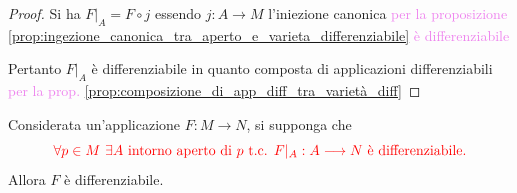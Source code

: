         \begin{proof}
        \mbox{}

        Si ha $F|_A = F \circ j$ essendo $j \colon A \to M$ l'iniezione canonica \textcolor{violet}{per la proposizione \ref{prop:ingezione_canonica_tra_aperto_e_varieta_differenziabile} è differenziabile}
        
        Pertanto $F|_A$ è differenziabile in quanto composta di applicazioni differenziabili \textcolor{violet}{per la prop. \ref{prop:composizione_di_app_diff_tra_varietà_diff}}
        \end{proof}
        \begin{proposizione}
        \label{prop:funzione_tra_varietà_localmente_diff_implica_diff}
        \mbox{}

        Considerata un'applicazione $F : M \longrightarrow N$, si supponga che
        \[
        \textcolor{red}{\forall p \in M \ \exists A \text{ intorno aperto di } p \text{ t.c. } F|_A : A \longrightarrow N \text{ è differenziabile.}}
        \]
        Allora $F$ è differenziabile.
        \end{proposizione}

